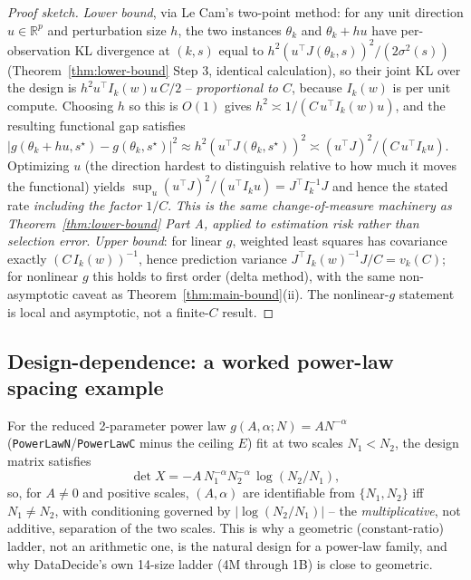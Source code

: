 \begin{proof}[Proof sketch]
\emph{Lower bound}, via Le Cam's two-point method: for any unit direction $u \in
\mathbb{R}^p$ and perturbation size $h$, the two instances $\theta_k$ and $\theta_k +
hu$ have per-observation KL divergence at $(k,s)$ equal to $h^2 (u^\top J(\theta_k,s))^2
/ (2\sigma^2(s))$ (Theorem~\ref{thm:lower-bound} Step 3, identical calculation), so
their joint KL over the design is $h^2 u^\top I_k(w) u \, C / 2$ -- \emph{proportional to
$C$}, because $I_k(w)$ is per unit compute. Choosing $h$ so this is $O(1)$ gives
$h^2 \asymp 1 / (C\, u^\top I_k(w) u)$, and the resulting functional gap satisfies
$|g(\theta_k+hu,s^\star) - g(\theta_k,s^\star)|^2 \approx h^2 (u^\top J(\theta_k,s^\star))^2
\asymp (u^\top J)^2 / (C\, u^\top I_k u)$. Optimizing $u$ (the direction hardest to
distinguish relative to how much it moves the functional) yields
$\sup_u (u^\top J)^2 / (u^\top I_k u) = J^\top I_k^{-1} J$ and hence the stated rate
\emph{including the factor $1/C$}. \emph{This is the same change-of-measure machinery as
Theorem~\ref{thm:lower-bound} Part A, applied to estimation risk rather than selection
error}. \emph{Upper bound}: for linear $g$, weighted least squares has covariance exactly
$(C\, I_k(w))^{-1}$, hence prediction variance $J^\top I_k(w)^{-1} J / C = v_k(C)$; for
nonlinear $g$ this holds to first order (delta method), with the same non-asymptotic
caveat as Theorem~\ref{thm:main-bound}(ii). The nonlinear-$g$ statement is local and
asymptotic, not a finite-$C$ result.
\end{proof}

\subsection{Design-dependence: a worked power-law spacing example}
\label{sec:theorem3-spacing}

\begin{proposition}
\label{prop:power-law-spacing}
For the reduced 2-parameter power law $g(A,\alpha; N) = A N^{-\alpha}$
(\texttt{PowerLawN}/\texttt{PowerLawC} minus the ceiling $E$) fit at two scales $N_1 <
N_2$, the design matrix satisfies
\[
  \det X = -A \, N_1^{-\alpha} N_2^{-\alpha} \, \log(N_2 / N_1),
\]
so, for $A \ne 0$ and positive scales, $(A, \alpha)$ are identifiable from $\{N_1, N_2\}$ iff $N_1 \ne N_2$, with
conditioning governed by $|\log(N_2/N_1)|$ -- the \emph{multiplicative}, not additive,
separation of the two scales. This is why a geometric (constant-ratio) ladder, not an
arithmetic one, is the natural design for a power-law family, and why DataDecide's own
14-size ladder (4M through 1B) is close to geometric.
\end{proposition}

